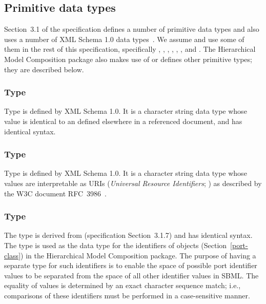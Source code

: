 \subsection{Primitive data types}
\label{new-primitive-types}

Section~3.1 of the \sbmlthreecore specification defines a number of
primitive data types and also uses a number of XML Schema 1.0 data
types~\citep{biron:2000}.  We assume and use some of them in the rest of
this specification, specifically , ,
, , ,
, and .  The Hierarchical Model
Composition package also makes use of or defines other primitive types;
they are described below.


\subsubsection{Type \fixttspace{}}
\label{primtype-idref}

Type  is defined by XML Schema 1.0.  It is a character
string data type whose value is identical to an  defined 
elsewhere in a referenced document, and has identical syntax.


\subsubsection{Type \fixttspace{}}
\label{primtype-anyuri}
\label{primtype-uri}

Type  is defined by XML Schema 1.0.  It is a character
string data type whose values are interpretable as URIs (\emph{Universal
  Resource Identifiers}; \citealt{harold:2001,w3c:2000}) as described by
the W3C document RFC~3986~\citep{rfc3986}.


\subsubsection{Type \fixttspace{}}
\label{primtype-portid}

The type  is derived from  (\sbmlthreecore specification Section~3.1.7) and has identical syntax.
The  type is used as the data type for the identifiers
of \Port objects (Section~\ref{port-class}) in the Hierarchical Model Composition
package.  The purpose of having a separate type for such identifiers is
to enable the space of possible port identifier values to be separated
from the space of all other identifier values in SBML.  The equality of
 values is determined by an exact character sequence
match; i.e., comparisons of these identifiers must be performed in a
case-sensitive manner.


